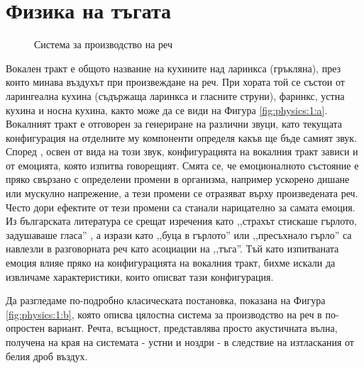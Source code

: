 \documentclass[main.tex]{subfiles}
\begin{document}
\section{Физика на тъгата}
    
    \begin{figure}[ht]%
        \centering
        \begin{changemargin}{0cm}{0cm} 
             \hspace{0.8cm}
        \end{changemargin} 
        \caption{Система за производство на реч}%
        \label{fig:physics:1}
    \end{figure}

    Вокален тракт е общото название на кухините над ларинкса (гръкляна), през които минава въздухът при произвеждане на реч.
    При хората той се състои от ларингеална кухина (съдържаща ларинкса и гласните струни), фаринкс, устна кухина и носна кухина, както може да се види на Фигура \autoref{fig:physics:1:a}. Вокалният тракт е отговорен за генериране на различни звуци, като текущата конфигурация на отделните му компоненти определя какъв ще бъде самият звук.
    Според \cite{emotional:shit}, освен от вида на този звук, конфигурацията на вокалния тракт зависи и от емоцията, която изпитва говорещият. Смята се, че емоционалното състояние е пряко свързано с определени промени в организма, например ускорено дишане или мускулно напрежение, а тези промени се отразяват върху произведената реч. Често дори ефектите от тези промени са станали нарицателно за самата емоция. Из българската литература се срещат изречения като ,,страхът стискаше гърлото, задушаваше гласа'' \cite{talev}, а изрази като ,,буца в гърлото'' или ,,пресъхнало гърло'' са навлезли в разговорната реч като асоциации на ,,тъга''. Тъй като изпитваната емоция влияе пряко на конфигурацията на вокалния тракт, бихме искали да извличаме характеристики, които описват тази конфигурация.
    
    Да разгледаме по-подробно класическата постановка, показана на Фигура \autoref{fig:physics:1:b}, която описва цялостна система за производство на реч в по-опростен вариант.
    Речта, всъщност, представлява просто акустичната вълна, получена на края на системата - устни и ноздри - в следствие на изтласкания от белия дроб въздух.
\end{document}
